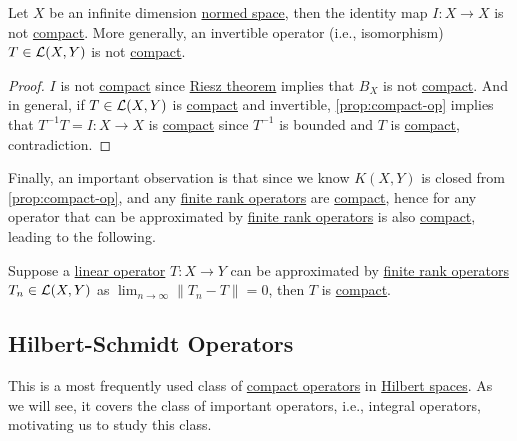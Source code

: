 \begin{corollary}\label{col:iso-are-not-compact}
	Let \(X\) be an infinite dimension \hyperref[def:normed-vector-space]{normed space}, then the identity map \(I\colon X\to X\) is not \hyperref[def:compact-op]{compact}. More generally, an invertible operator (i.e., isomorphism) \(T\in \mathcal{\MakeUppercase{l}} (X, Y)\) is not \hyperref[def:compact-op]{compact}.
\end{corollary}
\begin{proof}
	\(I\) is not \hyperref[def:compact-op]{compact} since \hyperref[thm:Riesz]{Riesz theorem} implies that \(B_X\) is not \hyperref[def:compact]{compact}. And in general, if \(T\in \mathcal{\MakeUppercase{l}} (X, Y)\) is \hyperref[def:compact-op]{compact} and invertible, \autoref{prop:compact-op} implies that \(T^{-1} T = I\colon X\to X\) is \hyperref[def:compact-op]{compact} since \(T^{-1} \) is bounded and \(T\) is \hyperref[def:compact-op]{compact}, contradiction.
\end{proof}

Finally, an important observation is that since we know \(K(X, Y)\) is closed from \autoref{prop:compact-op}, and any \hyperref[rmk:finite-rank-op]{finite rank operators} are \hyperref[def:compact-op]{compact}, hence for any operator that can be approximated by \hyperref[rmk:finite-rank-op]{finite rank operators} is also \hyperref[def:compact-op]{compact}, leading to the following.

\begin{corollary}\label{col:almost-finite-rank-op-are-compact}
	Suppose a \hyperref[def:linear-map]{linear operator} \(T\colon X\to Y\) can be approximated by \hyperref[rmk:finite-rank-op]{finite rank operators} \(T_{n} \in \mathcal{\MakeUppercase{l}} (X, Y)\) as \(\lim_{n \to \infty} \lVert T_{n} - T \rVert = 0\), then \(T\) is \hyperref[def:compact-op]{compact}.
\end{corollary}

\subsection{Hilbert-Schmidt Operators}
This is a most frequently used class of \hyperref[def:compact-op]{compact operators} in \hyperref[def:Hilbert-space]{Hilbert spaces}. As we will see, it covers the class of important operators, i.e., integral operators, motivating us to study this class.

